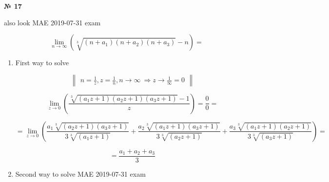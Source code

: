 \documentclass{article}
\begin{document}
\textbf{№ 17} 

also look MAE 2019-07-31 exam

\begingroup

$$ \lim_{n\to \infty} \left( \sqrt[3]{(n+a_1)(n+a_2)(n+a_3)} - n \right) 
= $$

\begin{enumerate}
\item First way to solve

$$ \begin{Vmatrix} n=\frac{1}{z}, z=\frac{1}{n}, n\to \infty \ \Rightarrow z\to\frac{1}{\infty}=0 \end{Vmatrix} $$

$$ \lim_{z\to 0} \left(\frac{\sqrt[3]{(a_1z+1)(a_2z+1)(a_3z+1)} - 1}{z} \right) 
= \frac{0}{0}
= $$

$$ = \lim_{z\to 0} \left( \frac{a_1\sqrt[3]{(a_2z+1)(a_3z+1)}}{3\sqrt[3]{(a_1z+1)}} 
+ \frac{a_2\sqrt[3]{(a_1z+1)(a_3z+1)}}{3\sqrt[3]{(a_2z+1)}} 
+ \frac{a_3\sqrt[3]{(a_1z+1)(a_2z+1)}}{3\sqrt[3]{(a_3z+1)}} \right)
= $$

$$ = \frac{a_1+a_2+a_3}{3} $$

\item Second way to solve
MAE 2019-07-31 exam


\end{enumerate}
\endgroup
\end{document}
